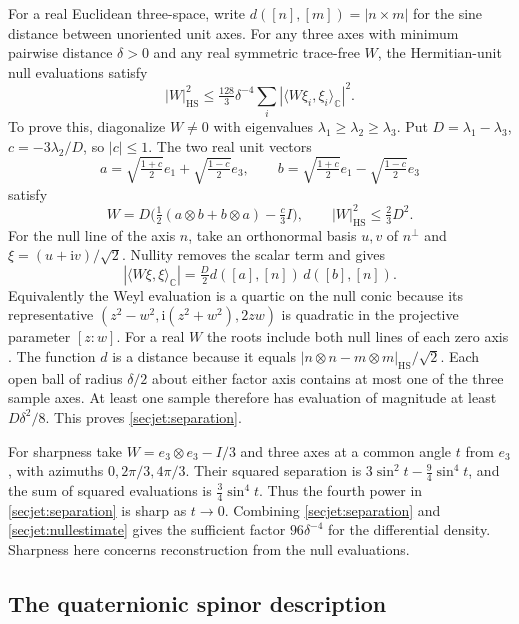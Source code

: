\documentclass[11pt]{article}
\numberwithin{equation}{section}
\theoremstyle{definition}
\theoremstyle{remark}
\begin{document}
For a real Euclidean three-space, write \(d([n],[m])=|n\times m|\)
for the sine distance between unoriented unit axes. For any three
axes with minimum pairwise distance \(\delta>0\) and any real
symmetric trace-free \(W\), the Hermitian-unit null evaluations satisfy
\begin{equation}
 \label{secjet:separation}
 |W|_{\mathrm{HS}}^2
       \le \tfrac{128}{3}\delta^{-4}
               \sum_i|\langle W\xi_i,\xi_i\rangle_{\mathbb C}|^2 .
\end{equation}
To prove this, diagonalize \(W\ne0\) with eigenvalues
\(\lambda_1\ge\lambda_2\ge\lambda_3\). Put \(D=\lambda_1-\lambda_3\),
\(c=-3\lambda_2/D\), so \(|c|\le1\). The two real unit vectors
\[
 a=\sqrt{\tfrac{1+c}{2}}e_1+\sqrt{\tfrac{1-c}{2}}e_3,\qquad
 b=\sqrt{\tfrac{1+c}{2}}e_1-\sqrt{\tfrac{1-c}{2}}e_3
\]
satisfy
\[
 W=D\bigl(\tfrac12(a\otimes b+b\otimes a)-\tfrac c3 I\bigr),
 \qquad |W|_{\mathrm{HS}}^2\le\tfrac23D^2 .
\]
For the null line of the axis \(n\), take an orthonormal basis
\(u,v\) of \(n^\perp\) and \(\xi=(u+\mathrm i v)/\sqrt2\).
Nullity removes the scalar term and gives
\[
 |\langle W\xi,\xi\rangle_{\mathbb C}|
        =\tfrac D2 d([a],[n])\,d([b],[n]).
\]
Equivalently the Weyl evaluation is a quartic on the null conic because
its representative \((z^2-w^2,\mathrm i(z^2+w^2),2zw)\) is quadratic
in the projective parameter \([z:w]\). For a real \(W\) the
roots include both null lines of each zero axis
\cite[Prop.~5.3]{GoverHillNurowski2011GoldbergSachs}.
The function \(d\) is a distance because it equals
\(|n\otimes n-m\otimes m|_{\mathrm{HS}}/\sqrt2\).
Each open ball of radius \(\delta/2\) about either factor axis
contains at most one of the three sample axes. At least one
sample therefore has evaluation of magnitude at least
\(D\delta^2/8\). This proves \eqref{secjet:separation}.

For sharpness take \(W=e_3\otimes e_3-I/3\) and three axes
at a common angle \(t\) from \(e_3\), with azimuths
\(0,2\pi/3,4\pi/3\). Their squared separation is
\(3\sin^2 t-\tfrac94\sin^4t\), and the sum of squared evaluations is
\(\tfrac34\sin^4t\). Thus the fourth power in
\eqref{secjet:separation} is sharp as \(t\to0\). Combining
\eqref{secjet:separation} and \eqref{secjet:nullestimate}
gives the sufficient factor \(96\delta^{-4}\) for the differential
density. Sharpness here concerns reconstruction from the null
evaluations.

\subsection{The quaternionic spinor description}
\end{document}
